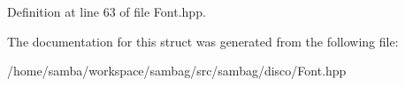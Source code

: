 Definition at line 63 of file Font.hpp.



The documentation for this struct was generated from the following file:\begin{DoxyCompactItemize}
\item 
/home/samba/workspace/sambag/src/sambag/disco/Font.hpp\end{DoxyCompactItemize}
